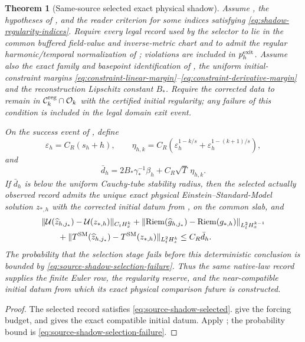 \documentclass[11pt]{article}
\numberwithin{equation}{section}
\newtheorem{theorem}{Theorem}[section]
\theoremstyle{definition}
\theoremstyle{remark}
\newcommand{\Riem}{\operatorname{Riem}}
\newcommand{\norm}[1]{\lVert#1\rVert}
\begin{document}
\begin{theorem}[Same-source selected exact physical shadow]
\label{thm:native-selected-shadow}
Assume , the hypotheses of
, and the reader criterion
 for some indices satisfying
\eqref{eq:shadow-regularity-indices}.  Require every legal record used by the
selector to lie in the common buffered field-value and inverse-metric chart
and to admit the regular harmonic/temporal normalization of
; violations are included in
$p_h^{\rm exit}$.  Assume also the exact family and basepoint identification of
, the uniform initial-constraint margins
\eqref{eq:constraint-linear-margin}--\eqref{eq:constraint-derivative-margin}
and the reconstruction Lipschitz constant $B_*$.  Require the corrected
data to remain in $\mathcal C_k^{\rm reg}\cap\mathcal O_k$ with the certified
initial regularity; any failure of this condition is included in the legal
domain exit event.

On the success event of , define
\begin{equation}
 \varepsilon_h=C_R(s_h+h),
 \qquad
 \eta_{h,k}=C_R\left(
 \varepsilon_h^{1-k/s}
 +\varepsilon_h^{1-(k+1)/s}\right),
 \label{eq:selected-shadow-forcing} 
\end{equation}
and
\begin{equation}
 \bar d_h
 =2B_*\gamma_*^{-1}\beta_h
  +C_R\sqrt T\,\eta_{h,k}.
 \label{eq:selected-shadow-budget}
\end{equation}
If $\bar d_h$ is below the uniform Cauchy-tube stability radius, then the
selected actually observed record admits the unique exact physical
Einstein--Standard-Model solution $z_{*,h}$ with the corrected initial datum
from , on the common slab, and
\begin{align}
 &\norm{\mathcal U(\widehat z_{h,j_*})-\mathcal U(z_{*,h})}_{C_tH_x^k}
 +\norm{\Riem(\widehat g_{h,j_*})-\Riem(g_{*,h})}_{L_t^2H_x^{k-1}}
 \notag\\
 &\qquad
 +\norm{T^{\rm SM}(\widehat z_{h,j_*})-T^{\rm SM}(z_{*,h})}_{L_t^2H_x^k}
 \le C_R\bar d_h.
 \label{eq:selected-exact-shadow}
\end{align}
The probability that the selection stage fails before this deterministic
conclusion is bounded by \eqref{eq:source-shadow-selection-failure}.  Thus the
same native-law record supplies the finite Euler row, the regularity reserve,
and the near-compatible initial datum from which its exact physical comparison
future is constructed.
\end{theorem}
\begin{proof}
The selected record satisfies \eqref{eq:source-shadow-selected}.
 give the
forcing budget, and  gives the
exact compatible initial datum. Apply
; the probability bound is
\eqref{eq:source-shadow-selection-failure}.
\end{proof}
\end{document}
